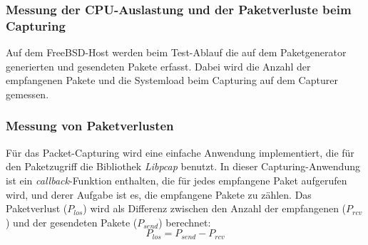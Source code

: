 \subsubsection{Messung der CPU-Auslastung und der Paketverluste beim Capturing}
Auf dem FreeBSD-Host werden beim Test-Ablauf die auf dem Paketgenerator
generierten und gesendeten Pakete erfasst. Dabei wird die Anzahl der
empfangenen Pakete und die Systemload beim Capturing auf dem Capturer gemessen.
%
\subsubsection*{Messung von Paketverlusten}
Für das Packet-Capturing wird eine einfache Anwendung implementiert, die für den
Paketzugriff die Bibliothek \emph{Libpcap} benutzt. In dieser Capturing-Anwendung ist
ein \emph{callback}-Funktion enthalten, die für jedes empfangene Paket
aufgerufen wird, und derer Aufgabe ist es, die empfangene Pakete zu zählen.
Das Paketverlust (\begin{math}P_{los}\end{math}) wird als Differenz zwischen 
den Anzahl der empfangenen (\begin{math}P_{rcv}\end{math}) und
der gesendeten Pakete (\begin{math}P_{send}\end{math}) berechnet:
	\begin{equation}
		P_{los} = P_{send} - P_{rcv}
		\label{equ:pktloss}
	\end{equation}
%
